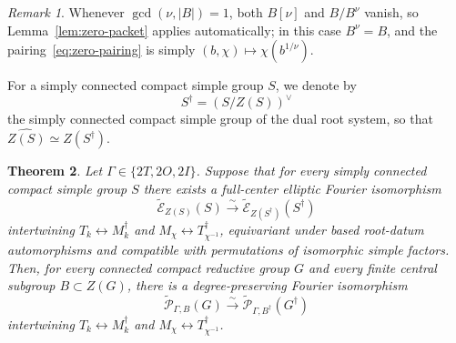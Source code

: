 \documentclass[11pt,a4paper,reqno]{amsart}
\theoremstyle{plain}
\newtheorem{theorem}{Theorem}[section]
\theoremstyle{definition}
\theoremstyle{remark}
\newtheorem{remark}[theorem]{Remark}
\numberwithin{equation}{section}
\newcommand{\wtE}{\widetilde{\mathcal E}}
\newcommand{\wtP}{\widetilde{\mathcal P}}
\begin{document}
\begin{remark}\label{rem:coprime-packet}
Whenever $\gcd(\nu,|B|)=1$, both $B[\nu]$ and $B/B^\nu$ vanish, so Lemma~\ref{lem:zero-packet} applies automatically; in this case $B^\nu=B$, and the pairing~\eqref{eq:zero-pairing} is simply $(b,\chi)\mapsto\chi(b^{1/\nu})$.
\end{remark}

For a simply connected compact simple group $S$, we denote by
\[
S^\dagger=(S/Z(S))^\vee
\]
the simply connected compact simple group of the dual root system, so that $\widehat{Z(S)}\simeq Z(S^\dagger)$.

\begin{theorem}\label{thm:transfer}
Let $\Gamma\in\{2T,2O,2I\}$. Suppose that for every simply connected compact simple group $S$ there exists a full-center elliptic Fourier isomorphism
\[
\wtE_{Z(S)}(S)\xrightarrow{\sim}\wtE_{Z(S^\dagger)}(S^\dagger)
\]
intertwining $T_k\leftrightarrow M_k^\dagger$ and $M_\chi\leftrightarrow T_{\chi^{-1}}^\dagger$, equivariant under based root-datum automorphisms and compatible with permutations of isomorphic simple factors. Then, for every connected compact reductive group $G$ and every finite central subgroup $B\subset Z(G)$, there is a degree-preserving Fourier isomorphism
\[
\wtP_{\Gamma,B}(G)\xrightarrow{\sim}\wtP_{\Gamma,B^\dagger}(G^\dagger)
\]
intertwining $T_k\leftrightarrow M_k^\dagger$ and $M_\chi\leftrightarrow T_{\chi^{-1}}^\dagger$.
\end{theorem}
\end{document}
